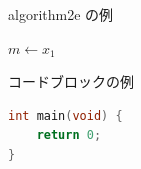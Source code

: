 \documentclass[aspectratio=169,unicode]{beamer}
\begin{document}
\begin{frame}{algorithm2e の例}
  \begin{algorithm}[H]
    $m \leftarrow x_1$\;
    \;
    \caption{最大値の探索}
  \end{algorithm}
\end{frame}

\begin{frame}[fragile]{コードブロックの例}
\begin{lstlisting}[language=C]
int main(void) {
    return 0;
}
\end{lstlisting}
\end{frame}
\end{document}
